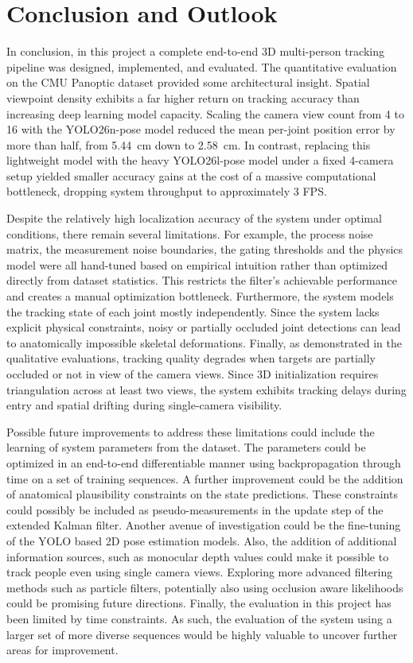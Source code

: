 
\section{Conclusion and Outlook} \label{conclusion}

In conclusion, in this project a complete end-to-end 3D multi-person tracking pipeline was designed, implemented, and evaluated. 
The quantitative evaluation on the CMU Panoptic dataset provided some architectural insight. Spatial viewpoint density exhibits a far higher return on tracking accuracy than increasing deep learning model capacity. Scaling the camera view count from 4 to 16 with the YOLO26n-pose model reduced the mean per-joint position error by more than half, from 5.44 cm down to 2.58 cm. In contrast, replacing this lightweight model with the heavy YOLO26l-pose model under a fixed 4-camera setup yielded smaller accuracy gains at the cost of a massive computational bottleneck, dropping system throughput to approximately 3 FPS.

Despite the relatively high localization accuracy of the system under optimal conditions, there remain several limitations. For example, the process noise matrix, the measurement noise boundaries, the gating thresholds and the physics model were all hand-tuned based on empirical intuition rather than optimized directly from dataset statistics. This restricts the filter's achievable performance and creates a manual optimization bottleneck. Furthermore, the system models the tracking state of each joint mostly independently. Since the system lacks explicit physical constraints, noisy or partially occluded joint detections can lead to anatomically impossible skeletal deformations. Finally, as demonstrated in the qualitative evaluations, tracking quality degrades when targets are partially occluded or not in view of the camera views. Since 3D initialization requires triangulation across at least two views, the system exhibits tracking delays during entry and spatial drifting during single-camera visibility.

Possible future improvements to address these limitations could include the learning of system parameters from the dataset. The parameters could be optimized in an end-to-end differentiable manner using backpropagation through time on a set of training sequences. A further improvement could be the addition of anatomical plausibility constraints on the state predictions. These constraints could possibly be included as pseudo-measurements in the update step of the extended Kalman filter. Another avenue of investigation could be the fine-tuning of the YOLO based 2D pose estimation models. Also, the addition of additional information sources, such as monocular depth values could make it possible to track people even using single camera views. Exploring more advanced filtering methods such as particle filters, potentially also using occlusion aware likelihoods could be promising future directions. Finally, the evaluation in this project has been limited by time constraints. As such, the evaluation of the system using a larger set of more diverse sequences would be highly valuable to uncover further areas for improvement.
